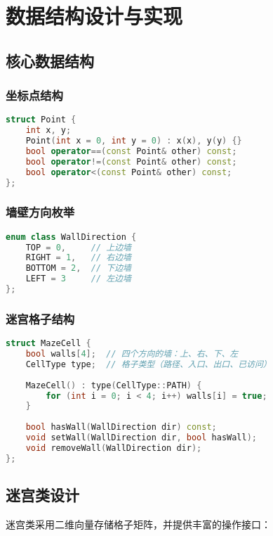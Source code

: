 \documentclass[UTF8]{ctexart}
\begin{document}
\section{数据结构设计与实现}

\subsection{核心数据结构}

\subsubsection{坐标点结构}
\begin{lstlisting}[language=C++]
struct Point {
    int x, y;
    Point(int x = 0, int y = 0) : x(x), y(y) {}
    bool operator==(const Point& other) const;
    bool operator!=(const Point& other) const;
    bool operator<(const Point& other) const;
};
\end{lstlisting}

\subsubsection{墙壁方向枚举}
\begin{lstlisting}[language=C++]
enum class WallDirection {
    TOP = 0,     // 上边墙
    RIGHT = 1,   // 右边墙
    BOTTOM = 2,  // 下边墙
    LEFT = 3     // 左边墙
};
\end{lstlisting}

\subsubsection{迷宫格子结构}
\begin{lstlisting}[language=C++]
struct MazeCell {
    bool walls[4];  // 四个方向的墙：上、右、下、左
    CellType type;  // 格子类型（路径、入口、出口、已访问）
    
    MazeCell() : type(CellType::PATH) {
        for (int i = 0; i < 4; i++) walls[i] = true;
    }
    
    bool hasWall(WallDirection dir) const;
    void setWall(WallDirection dir, bool hasWall);
    void removeWall(WallDirection dir);
};
\end{lstlisting}

\subsection{迷宫类设计}

迷宫类采用二维向量存储格子矩阵，并提供丰富的操作接口：
\end{document}
